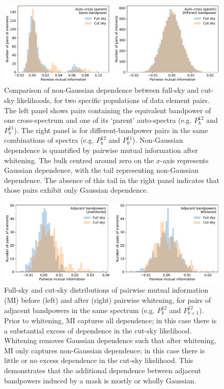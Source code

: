 \begin{figure}
\centering
\includegraphics[width=\textwidth]{mi_parent}
\caption{Comparison of non-Gaussian dependence between full-sky and cut-sky likelihoods, for two specific populations of data element pairs. The left panel shows pairs containing the equivalent bandpower of one cross-spectrum and one of its `parent' auto-spectra (e.g. $P_b^{12}$ and $P_b^{11}$). The right panel is for different-bandpower pairs in the same combinations of spectra (e.g. $P_b^{12}$ and $P_{b'}^{11}$). Non-Gaussian dependence is quantified by pairwise mutual information after whitening. The bulk centred around zero on the $x$-axis represents Gaussian dependence, with the tail representing non-Gaussian dependence. The absence of this tail in the right panel indicates that those pairs exhibit only Gaussian dependence.}
\label{gl_Fig:mi_parent}
\end{figure}

\begin{figure}
\centering
\includegraphics[width=\textwidth]{mi_adj_bp}
\caption{Full-sky and cut-sky distributions of pairwise mutual information (MI) before (left) and after (right) pairwise whitening, for pairs of adjacent bandpowers in the same spectrum (e.g. $P_b^{12}$ and $P_{b + 1}^{12}$). Prior to whitening, MI captures all dependence; in this case there is a substantial excess of dependence in the cut-sky likelihood. Whitening removes Gaussian dependence such that after whitening, MI only captures non-Gaussian dependence; in this case there is little or no excess dependence in the cut-sky likelihood.  This demonstrates that the additional dependence between adjacent bandpowers induced by a mask is mostly or wholly Gaussian.}
\label{gl_Fig:mi_adj_bp}
\end{figure}

